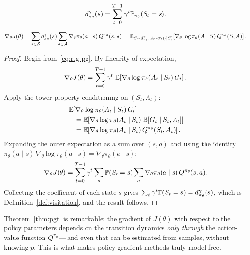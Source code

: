\begin{definition}
\label{def:visitation}
\[
d^{\gamma}_{\pi_\theta}(s) = \sum_{t=0}^{T-1} \gamma^t \mathbb{P}_{\pi_\theta}(S_t = s).
\]
\end{definition}

\begin{theorem}
\label{thm:pgt}
\begin{equation}
\label{eq:pgt}
\nabla_\theta J(\theta)
= \sum_{s \in \mathcal{S}} d^{\gamma}_{\pi_\theta}(s) \sum_{a \in \mathcal{A}} \nabla_\theta \pi_\theta(a \mid s)\, Q^{\pi_\theta}(s,a)
= \operatorname{\mathbb{E}}_{S \sim d^{\gamma}_{\pi_\theta},\, A \sim \pi_\theta(\cdot \mid S)}\!\left[\nabla_\theta \log \pi_\theta(A \mid S)\, Q^{\pi_\theta}(S,A)\right].
\end{equation}
\end{theorem}

\begin{proof}
Begin from~\eqref{eq:rtg-pg}.  By linearity of expectation,
\[
\nabla_\theta J(\theta)
= \sum_{t=0}^{T-1} \gamma^t\, \operatorname{\mathbb{E}}\!\left[\nabla_\theta \log \pi_\theta(A_t \mid S_t)\, G_t\right].
\]
Apply the tower property conditioning on $(S_t, A_t)$:
\begin{align*}
&\operatorname{\mathbb{E}}\!\left[\nabla_\theta \log \pi_\theta(A_t \mid S_t)\, G_t\right]\\
&\quad= \operatorname{\mathbb{E}}\!\left[\nabla_\theta \log \pi_\theta(A_t \mid S_t)\, \operatorname{\mathbb{E}}[G_t \mid S_t, A_t]\right]\\
&\quad= \operatorname{\mathbb{E}}\!\left[\nabla_\theta \log \pi_\theta(A_t \mid S_t)\, Q^{\pi_\theta}(S_t, A_t)\right].
\end{align*}
Expanding the outer expectation as a sum over $(s,a)$ and using the identity $\pi_\theta(a \mid s)\, \nabla_\theta \log \pi_\theta(a \mid s) = \nabla_\theta \pi_\theta(a \mid s)$:
\[
\nabla_\theta J(\theta)
= \sum_{t=0}^{T-1} \gamma^t \sum_s \mathbb{P}(S_t = s) \sum_a \nabla_\theta \pi_\theta(a \mid s)\, Q^{\pi_\theta}(s,a).
\]
Collecting the coefficient of each state $s$ gives $\sum_t \gamma^t \mathbb{P}(S_t = s) = d^{\gamma}_{\pi_\theta}(s)$, which is Definition~\ref{def:visitation}, and the result follows.
\end{proof}

\begin{remark}
\label{rem:pgt-model-free}
Theorem~\ref{thm:pgt} is remarkable: the gradient of $J(\theta)$ with respect to the policy parameters depends on the transition dynamics \emph{only through} the action-value function $Q^{\pi_\theta}$\,---\,and even that can be estimated from samples, without knowing $p$.  This is what makes policy gradient methods truly model-free.
\end{remark}

